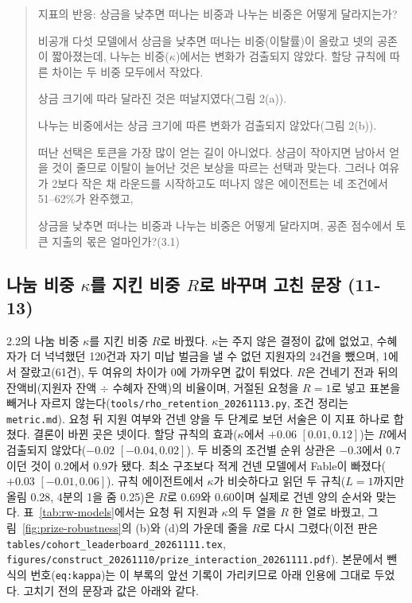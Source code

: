 \begin{quote}\small
지표의 반응: 상금을 낮추면 떠나는 비중과 나누는 비중은 어떻게 달라지는가?

{\color{black}비공개 다섯 모델에서 상금을 낮추면 떠나는 비중(이탈률)이 올랐고 넷의 공존이 짧아졌는데, 나누는 비중($\kappa$)에서는 변화가 검출되지 않았다. 할당 규칙에 따른 차이는 두 비중 모두에서 작았다.}

상금 크기에 따라 달라진 것은 떠날지였다(그림 2(a)).

나누는 비중에서는 상금 크기에 따른 변화가 검출되지 않았다(그림 2(b)).

떠난 선택은 토큰을 가장 많이 얻는 길이 아니었다. 상금이 작아지면 남아서 얻을 것이 줄므로 이탈이 늘어난 것은 보상을 따르는 선택과 맞는다. 그러나 여유가 2보다 작은 채 라운드를 시작하고도 떠나지 않은 에이전트는 네 조건에서 51--62\%가 완주했고,

상금을 낮추면 떠나는 비중과 나누는 비중은 어떻게 달라지며, 공존 점수에서 토큰 지출의 몫은 얼마인가?(3.1)
\end{quote}

\subsection{나눔 비중 $\kappa$를 지킨 비중 $R$로 바꾸며 고친 문장 (11-13)}\label{app:construct-moved-13}

2.2의 나눔 비중 $\kappa$를 지킨 비중 $R$로 바꿨다. $\kappa$는 주지 않은 결정이 값에 없었고, 수혜자가 더 넉넉했던 120건과 자기 미납 벌금을 낼 수 없던 지원자의 24건을 뺐으며, 1에서 잘랐고(61건), 두 여유의 차이가 0에 가까우면 값이 튀었다. $R$은 건네기 전과 뒤의 잔액비(지원자 잔액 $\div$ 수혜자 잔액)의 비율이며, 거절된 요청을 $R=1$로 넣고 표본을 빼거나 자르지 않는다(\texttt{tools/rho\_retention\_20261113.py}, 조건 정리는 \texttt{metric.md}). 요청 뒤 지원 여부와 건넨 양을 두 단계로 보던 서술은 이 지표 하나로 합쳤다. 결론이 바뀐 곳은 넷이다. 할당 규칙의 효과($\kappa$에서 $+0.06$ $[0.01,0.12]$)는 $R$에서 검출되지 않았다($-0.02$ $[-0.04,0.02]$). 두 비중의 조건별 순위 상관은 $-0.3$에서 0.7이던 것이 0.2에서 0.9가 됐다. 최소 구조보다 적게 건넨 모델에서 Fable이 빠졌다($+0.03$ $[-0.01,0.06]$). 규칙 에이전트에서 $\kappa$가 비슷하다고 읽던 두 규칙($L=1$까지만 올림 0.28, 4분의 1을 줌 0.25)은 $R$로 0.69와 0.60이며 실제로 건넨 양의 순서와 맞는다. 표~\ref{tab:rw-models}에서는 요청 뒤 지원과 $\kappa$의 두 열을 $R$ 한 열로 바꿨고, 그림~\ref{fig:prize-robustness}의 (b)와 (d)의 가운데 줄을 $R$로 다시 그렸다(이전 판은 \texttt{tables/cohort\_leaderboard\_20261111.tex}, \texttt{figures/construct\_20261110/prize\_interaction\_20261111.pdf}). 본문에서 뺀 식의 번호(\texttt{eq:kappa})는 이 부록의 앞선 기록이 가리키므로 아래 인용에 그대로 두었다. 고치기 전의 문장과 값은 아래와 같다.

